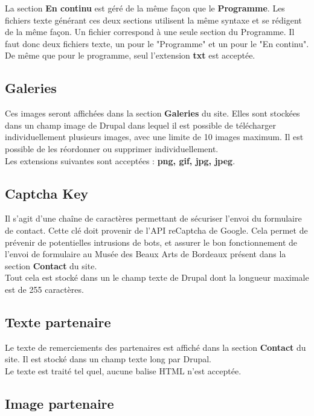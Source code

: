 \documentclass[11pt]{report}
\begin{document}
La section \textbf{En continu} est géré de la même façon que le \textbf{Programme}.
Les fichiers texte générant ces deux sections utilisent la même syntaxe et se
rédigent de la même façon. Un fichier correspond à une seule section du Programme.
Il faut donc deux fichiers texte, un pour le "Programme" et un pour le "En continu".
De même que pour le programme, seul l'extension \textbf{txt} est acceptée.

\subsection{Galeries}

Ces images seront affichées dans la section \textbf{Galeries} du site. Elles sont
stockées dans un champ image de Drupal dans lequel il est possible de télécharger
individuellement plusieurs images, avec une limite de 10 images maximum.
Il est possible de les réordonner ou supprimer individuellement. \\
Les extensions suivantes sont acceptées : \textbf{png, gif, jpg, jpeg}.

\subsection{Captcha Key}

Il s'agit d'une chaîne de caractères permettant de sécuriser l'envoi du formulaire
de contact. Cette clé doit provenir de l'API reCaptcha de Google. Cela permet de
prévenir de potentielles intrusions de bots, et assurer le bon fonctionnement
de l'envoi de formulaire au Musée des Beaux Arts de Bordeaux présent dans la
section \textbf{Contact} du site.\\
Tout cela est stocké dans un le champ texte de Drupal dont la longueur maximale
est de 255 caractères.

\subsection{Texte partenaire}

Le texte de remerciements des partenaires est affiché dans la section
\textbf{Contact} du site. Il est stocké dans un champ texte long par Drupal. \\
Le texte est traité tel quel, aucune balise HTML n'est acceptée.

\subsection{Image partenaire}
\end{document}
